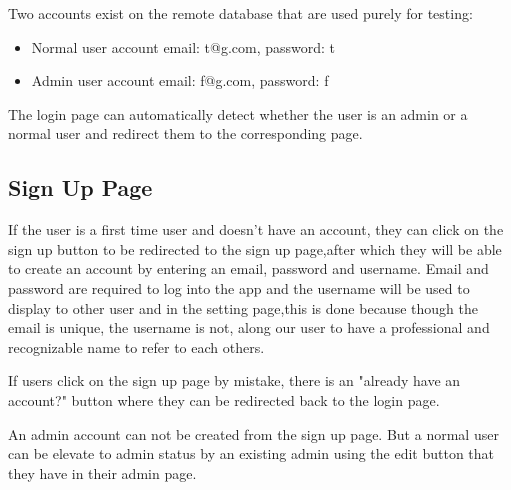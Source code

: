 Two accounts exist on the remote database that are used purely for testing:
\begin{itemize}
    \item Normal user account email: t@g.com, password: t
    \item Admin user account email: f@g.com, password: f
\end{itemize}

The login page can automatically detect whether the user is an admin or a normal user and redirect them to the corresponding
page.

\subsection{Sign Up Page}
\label{subsection:signup}
If the user is a first time user and doesn't have an account, they can click on the sign up button to be redirected to the sign up page,after which they will be able to create an account by entering an email, password and username. Email and password are required to log into the app and the username will be used to display to other user and in the setting page,this is done because though the email is unique, the username is not, along our user to have a professional and recognizable name to refer to each others. 

If users click on the sign up page by mistake, there is an "already have an account?" button where they can be redirected back to the 
login page.  

An admin account can not be created from the sign up page. But a normal user can be elevate to admin status by an existing admin
using the edit button that they have in their admin page.

